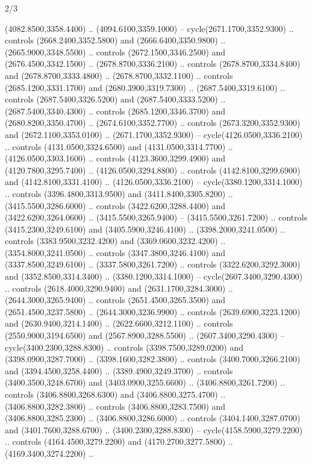 \begin{flagdescription}{2/3}
\begin{scope}[shift={(0.5\flaglength,0.5)},scale=\flagwidth/130]
\begin{scope}[y=0.01mm, x=0.01mm,shift={(-3365,-2250)}]
  (4082.8500,3358.4400) .. (4094.6100,3359.1000) -- cycle(2671.1700,3352.9300)
  .. controls (2668.2400,3352.5800) and (2666.6400,3350.9800) ..
  (2665.9000,3348.5500) .. controls (2672.1500,3346.2500) and
  (2676.4500,3342.1500) .. (2678.8700,3336.2100) .. controls
  (2678.8700,3334.8400) and (2678.8700,3333.4800) .. (2678.8700,3332.1100) ..
  controls (2685.1200,3331.1700) and (2680.3900,3319.7300) ..
  (2687.5400,3319.6100) .. controls (2687.5400,3326.5200) and
  (2687.5400,3333.5200) .. (2687.5400,3340.4300) .. controls
  (2685.1200,3346.3700) and (2680.8200,3350.4700) .. (2674.6100,3352.7700) ..
  controls (2673.3200,3352.9300) and (2672.1100,3353.0100) ..
  (2671.1700,3352.9300) -- cycle(4126.0500,3336.2100) .. controls
  (4131.0500,3324.6500) and (4131.0500,3314.7700) .. (4126.0500,3303.1600) ..
  controls (4123.3600,3299.4900) and (4120.7800,3295.7400) ..
  (4126.0500,3294.8800) .. controls (4142.8100,3299.6900) and
  (4142.8100,3331.4100) .. (4126.0500,3336.2100) -- cycle(3380.1200,3314.1000)
  .. controls (3396.4800,3313.9500) and (3411.8400,3305.8200) ..
  (3415.5500,3286.6000) .. controls (3422.6200,3288.4400) and
  (3422.6200,3264.0600) .. (3415.5500,3265.9400) -- (3415.5500,3261.7200) ..
  controls (3415.2300,3249.6100) and (3405.5900,3246.4100) ..
  (3398.2000,3241.0500) .. controls (3383.9500,3232.4200) and
  (3369.0600,3232.4200) .. (3354.8000,3241.0500) .. controls
  (3347.3800,3246.4100) and (3337.8500,3249.6100) .. (3337.5800,3261.7200) ..
  controls (3322.6200,3292.3000) and (3352.8500,3314.3400) ..
  (3380.1200,3314.1000) -- cycle(2607.3400,3290.4300) .. controls
  (2618.4000,3290.9400) and (2631.1700,3284.3000) .. (2644.3000,3265.9400) ..
  controls (2651.4500,3265.3500) and (2651.4500,3237.5800) ..
  (2644.3000,3236.9900) .. controls (2639.6900,3223.1200) and
  (2630.9400,3214.1400) .. (2622.6600,3212.1100) .. controls
  (2550.9000,3194.6500) and (2567.8900,3288.5500) .. (2607.3400,3290.4300) --
  cycle(3400.2300,3288.8300) .. controls (3398.7500,3289.0200) and
  (3398.0900,3287.7000) .. (3398.1600,3282.3800) .. controls
  (3400.7000,3266.2100) and (3394.4500,3258.4400) .. (3389.4900,3249.3700) ..
  controls (3400.3500,3248.6700) and (3403.0900,3255.6600) ..
  (3406.8800,3261.7200) .. controls (3406.8800,3268.6300) and
  (3406.8800,3275.4700) .. (3406.8800,3282.3800) .. controls
  (3406.8800,3283.7500) and (3406.8800,3285.2300) .. (3406.8800,3286.6000) ..
  controls (3404.1400,3287.0700) and (3401.7600,3288.6700) ..
  (3400.2300,3288.8300) -- cycle(4158.5900,3279.2200) .. controls
  (4164.4500,3279.2200) and (4170.2700,3277.5800) .. (4169.3400,3274.2200) ..

\end{scope}
\end{scope}
\end{flagdescription}
